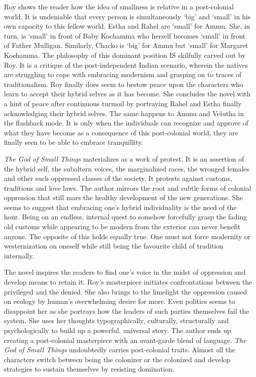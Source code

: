 Roy shows the reader how the idea of smallness is relative in a post-colonial world. It is undeniable that every person is simultaneously `big' and `small' in his own capacity to this fellow world. Estha and Rahel are `small' for Ammu. She, in turn, is `small' in front of Baby Kochamma who herself becomes `small' in front of Father Mulligan. Similarly, Chacko is `big' for Ammu but `small' for Margaret Kochamma. The philosophy of this dominant position IS skilfully carved out by Roy. It is a critique of the post-independent Indian scenario, wherein the natives are struggling to cope with embracing modernism and grasping on to traces of traditionalism. Roy finally does seem to bestow peace upon the characters who learn to accept their hybrid selves as it has become. She concludes the novel with a hint of peace after continuous turmoil by portraying Rahel and Estha finally acknowledging their hybrid selves. The same happens to Ammu and Velutha in the flashback mode. It is only when the individuals can recognize and approve of what they have become as a consequence of this post-colonial world, they are finally seen to be able to embrace tranquillity.

\emph{The God of Small Things} materializes as a work of protest. It is an assertion of the hybrid self, the subaltern voices, the marginalized races, the wronged females and other such oppressed classes of the society. It protests against customs, traditions and love laws. The author mirrors the root and subtle forms of colonial oppression that still mars the healthy development of the new generations. She seems to suggest that embracing one's hybrid individuality is the need of the hour. Being on an endless, internal quest to somehow forcefully grasp the fading old customs while appearing to be modern from the exterior can never benefit anyone. The opposite of this holds equally true. One must not force modernity or westernization on oneself while still being the favourite child of tradition internally. 

The novel inspires the readers to find one's voice in the midst of oppression and develop means to retain it. Roy's masterpiece initiates confrontations between the privileged and the denied. She also brings to the limelight the oppression caused on ecology by human's overwhelming desire for more. Even politics seems to disappoint her as she portrays how the leaders of such parties themselves fail the system. She uses her thoughts typographically, culturally, structurally and psychologically to build up a powerful, universal story. The author ends up creating a post-colonial masterpiece with an avant-garde blend of language. \emph{The God of Small Things }undoubtedly carries post-colonial traits. Almost all the characters switch between being the colonizer or the colonized and develop strategies to sustain themselves by resisting domination.




